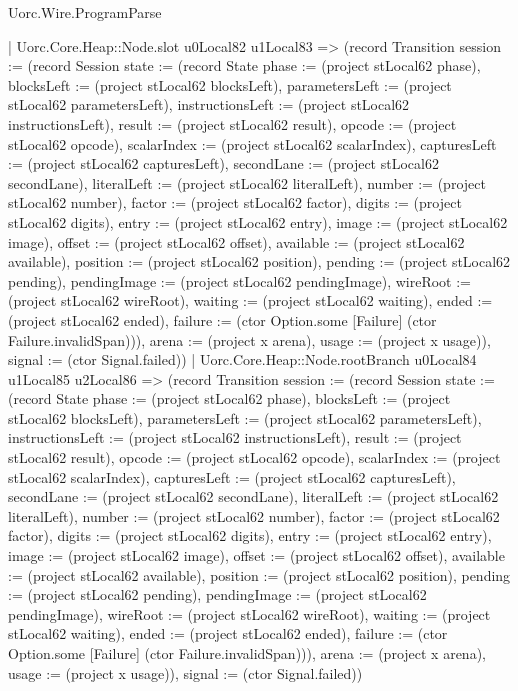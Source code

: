\begin{lexlean}{Uorc.Wire.ProgramParse}
\begin{semanticmodule}
{        | Uorc.Core.Heap::Node.slot u0Local82 u1Local83 => (record Transition {session := (record Session {state := (record State {phase := (project stLocal62 phase), blocksLeft := (project stLocal62 blocksLeft), parametersLeft := (project stLocal62 parametersLeft), instructionsLeft := (project stLocal62 instructionsLeft), result := (project stLocal62 result), opcode := (project stLocal62 opcode), scalarIndex := (project stLocal62 scalarIndex), capturesLeft := (project stLocal62 capturesLeft), secondLane := (project stLocal62 secondLane), literalLeft := (project stLocal62 literalLeft), number := (project stLocal62 number), factor := (project stLocal62 factor), digits := (project stLocal62 digits), entry := (project stLocal62 entry), image := (project stLocal62 image), offset := (project stLocal62 offset), available := (project stLocal62 available), position := (project stLocal62 position), pending := (project stLocal62 pending), pendingImage := (project stLocal62 pendingImage), wireRoot := (project stLocal62 wireRoot), waiting := (project stLocal62 waiting), ended := (project stLocal62 ended), failure := (ctor Option.some [Failure] (ctor Failure.invalidSpan))}), arena := (project x arena), usage := (project x usage)}), signal := (ctor Signal.failed)})
        | Uorc.Core.Heap::Node.rootBranch u0Local84 u1Local85 u2Local86 => (record Transition {session := (record Session {state := (record State {phase := (project stLocal62 phase), blocksLeft := (project stLocal62 blocksLeft), parametersLeft := (project stLocal62 parametersLeft), instructionsLeft := (project stLocal62 instructionsLeft), result := (project stLocal62 result), opcode := (project stLocal62 opcode), scalarIndex := (project stLocal62 scalarIndex), capturesLeft := (project stLocal62 capturesLeft), secondLane := (project stLocal62 secondLane), literalLeft := (project stLocal62 literalLeft), number := (project stLocal62 number), factor := (project stLocal62 factor), digits := (project stLocal62 digits), entry := (project stLocal62 entry), image := (project stLocal62 image), offset := (project stLocal62 offset), available := (project stLocal62 available), position := (project stLocal62 position), pending := (project stLocal62 pending), pendingImage := (project stLocal62 pendingImage), wireRoot := (project stLocal62 wireRoot), waiting := (project stLocal62 waiting), ended := (project stLocal62 ended), failure := (ctor Option.some [Failure] (ctor Failure.invalidSpan))}), arena := (project x arena), usage := (project x usage)}), signal := (ctor Signal.failed)})
}
\end{semanticmodule}
\end{lexlean}
